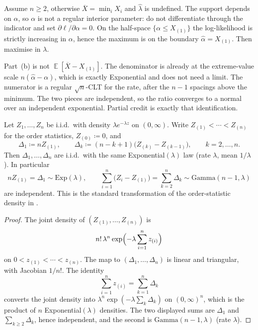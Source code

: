 \documentclass[11pt,a4paper]{article}
\DeclareMathOperator{\E}{\mathbb{E}}
\begin{document}
Assume \( n\ge 2 \), otherwise \( \overline{X}=\min_i X_i \) and \( \hat{\lambda} \) is undefined. The support depends on \( \alpha \), so \( \alpha \) is not a regular interior parameter: do not differentiate through the indicator and set \( \partial\ell/\partial\alpha=0 \). On the half-space \( \{\alpha\le X_{(1)}\} \) the log-likelihood is strictly increasing in \( \alpha \), hence the maximum is on the boundary \( \hat{\alpha}=X_{(1)} \). Then maximise in \( \lambda \).

Part~(b) is not \( \E[\overline{X}-X_{(1)}] \). The denominator is already at the extreme-value scale \( n(\hat{\alpha}-\alpha) \), which is exactly Exponential and does not need a limit. The numerator is a regular \( \sqrt{n} \)-CLT for the rate, after the \( n-1 \) spacings above the minimum. The two pieces are independent, so the ratio converges to a normal over an independent exponential. Partial credit is exactly that identification.

\begin{theorem}
\label{thm:exp-spacings}
Let \( Z_1,\dots,Z_n \) be i.i.d.\ with density \( \lambda e^{-\lambda z} \) on \( (0,\infty) \). Write \( Z_{(1)}<\cdots<Z_{(n)} \) for the order statistics, \( Z_{(0)}\coloneqq 0 \), and
\[
\Delta_1
\coloneqq
n Z_{(1)},
\qquad
\Delta_k
\coloneqq
(n-k+1)\bigl(Z_{(k)}-Z_{(k-1)}\bigr),
\qquad
k=2,\dots,n.
\]
Then \( \Delta_1,\dots,\Delta_n \) are i.i.d.\ with the same Exponential\( (\lambda) \) law (rate \( \lambda \), mean \( 1/\lambda \)). In particular
\[
n Z_{(1)}
=
\Delta_1
\sim
\mathrm{Exp}(\lambda),
\qquad
\sum_{i=1}^{n}\bigl(Z_i-Z_{(1)}\bigr)
=
\sum_{k=2}^{n}\Delta_k
\sim
\mathrm{Gamma}(n-1,\lambda)
\]
are independent. This is the standard transformation of the order-statistic density in \citep[\S4.4]{hogg2019}.
\end{theorem}

\begin{proof}
The joint density of \( (Z_{(1)},\dots,Z_{(n)}) \) is
\[
n!\,\lambda^{n}\exp\Bigl(-\lambda\sum_{i=1}^{n}z_{(i)}\Bigr)
\]
on \( 0<z_{(1)}<\cdots<z_{(n)} \). The map to \( (\Delta_1,\dots,\Delta_n) \) is linear and triangular, with Jacobian \( 1/n! \). The identity
\[
\sum_{i=1}^{n}z_{(i)}
=
\sum_{k=1}^{n}\Delta_k
\]
converts the joint density into \( \lambda^{n}\exp(-\lambda\sum_{k}\Delta_k) \) on \( (0,\infty)^{n} \), which is the product of \( n \) Exponential\( (\lambda) \) densities. The two displayed sums are \( \Delta_1 \) and \( \sum_{k\ge 2}\Delta_k \), hence independent, and the second is \( \mathrm{Gamma}(n-1,\lambda) \) (rate \( \lambda \)).
\end{proof}
\end{document}
